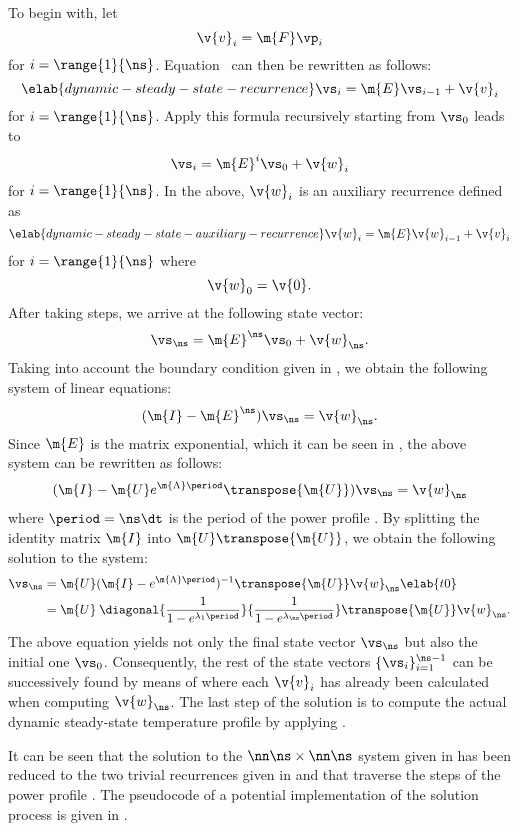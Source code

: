 To begin with, let
\[
  \v{v}_i = \m{F} \vp_i
\]
for $i = \range{1}{\ns}$. Equation~ can then be
rewritten as follows:
\begin{equation} \elab{dynamic-steady-state-recurrence}
  \vs_i = \m{E} \vs_{i - 1} + \v{v}_i
\end{equation}
for $i = \range{1}{\ns}$. Apply this formula recursively starting from $\vs_0$
leads to
\[
  \vs_i = \m{E}^i \vs_0 + \v{w}_i
\]
for $i = \range{1}{\ns}$. In the above, $\v{w}_i$ is an auxiliary recurrence
defined as
\begin{equation} \elab{dynamic-steady-state-auxiliary-recurrence}
  \v{w}_i = \m{E} \v{w}_{i - 1} + \v{v}_i
\end{equation}
for $i = \range{1}{\ns}$ where
\[
  \v{w}_0 = \v{0}.
\]
After taking \ns steps, we arrive at the following state vector:
\[
  \vs_\ns = \m{E}^\ns \vs_0 + \v{w}_\ns.
\]
Taking into account the boundary condition given in
, we obtain the following system of linear
equations:
\[
  (\m{I} - \m{E}^\ns) \vs_\ns = \v{w}_\ns.
\]
Since $\m{E}$ is the matrix exponential, which it can be seen in
, the above system can be rewritten as follows:
\[
  (\m{I} - \m{U} e^{\m{\Lambda} \period} \transpose{\m{U}}) \vs_\ns = \v{w}_\ns
\]
where $\period = \ns \dt$ is the period of the power profile \mp. By splitting
the identity matrix $\m{I}$ into $\m{U} \transpose{\m{U}}$, we obtain the
following solution to the system:
\begin{align}
  \vs_\ns
  & = \m{U} (\m{I} - e^{\m{\Lambda} \period})^{-1} \transpose{\m{U}} \v{w}_\ns \elab{t0} \\
  & = \m{U} \: \diagonal{\frac{1}{1 - e^{\lambda_1 \period}}}{\frac{1}{1 - e^{\lambda_\ns \period}}} \transpose{\m{U}} \v{w}_\ns. \nonumber
\end{align}
The above equation yields not only the final state vector $\vs_\ns$ but also the
initial one $\vs_0$. Consequently, the rest of the state vectors $\{ \vs_i \}_{i
= 1}^{\ns - 1}$ can be successively found by means of
 where each $\v{v}_i$ has already been
calculated when computing $\v{w}_\ns$. The last step of the solution is to
compute the actual dynamic steady-state temperature profile \mq by applying
.

It can be seen that the solution to the $\nn \ns \times \nn \ns$ system given in
 has been reduced to the two trivial
recurrences given in  and
 that traverse the \ns steps of
the power profile \mp. The pseudocode of a potential implementation of the
solution process is given in .


